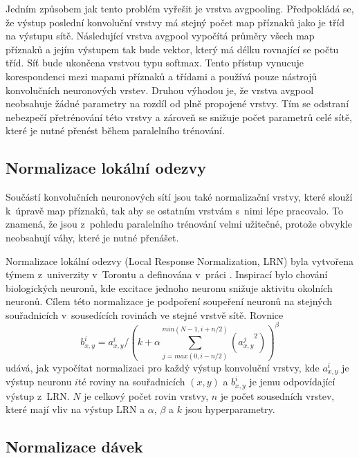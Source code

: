 Jedním způsobem jak tento problém vyřešit je vrstva avgpooling.
Předpokládá se, že výstup poslední konvoluční vrstvy má stejný počet map příznaků jako je tříd na výstupu sítě.
Následující vrstva avgpool vypočítá průměry všech map příznaků a jejím výstupem tak bude vektor, který má délku rovnající se počtu tříd.
Síť bude ukončena vrstvou typu softmax.
Tento přístup vynucuje korespondenci mezi mapami příznaků a třídami a používá pouze nástrojů konvolučních neuronových vrstev.
Druhou výhodou je, že vrstva avgpool neobsahuje žádné parametry na rozdíl od plně propojené vrstvy.
Tím se odstraní nebezpečí přetrénování této vrstvy a zároveň se snižuje počet parametrů celé sítě, které je nutné přenést během paralelního trénování.

\subsection{Normalizace lokální odezvy}
\label{sub:lrn}

Součástí konvolučních neuronových sítí jsou také normalizační vrstvy, které slouží k~úpravě map příznaků, tak aby se ostatním vrstvám s~nimi lépe pracovalo.
To znamená, že jsou z~pohledu paralelního trénování velmi užitečné, protože obvykle neobsahují váhy, které je nutné přenášet.

Normalizace lokální odezvy (Local Response Normalization, LRN) byla vytvořena týmem z~univerzity v~Torontu a definována v~práci \cite{Krizhevsky2012}.
Inspirací bylo chování biologických neuronů, kde excitace jednoho neuronu snižuje aktivitu okolních neuronů.
Cílem této normalizace je podpoření soupeření neuronů na stejných souřadnicích v~sousedících rovinách ve stejné vrstvě sítě.
Rovnice \begin{equation}b^{i}_{x,y}=a^{i}_{x,y}/\left(k+{\alpha}\sum^{min(N-1,i+n/2)}_{j=max(0,i-n/2)}({a^{j}_{x,y}}^{2})\right)^{\beta}\label{eq:lrn}\end{equation} udává, jak vypočítat normalizaci pro každý výstup konvoluční vrstvy, kde $a^{i}_{x,y}$ je výstup neuronu $i$té roviny na souřadnicích $(x,y)$ a $b^{i}_{x,y}$ je jemu odpovídající výstup z~LRN.
$N$ je celkový počet rovin vrstvy, $n$ je počet sousedních vrstev, které mají vliv na výstup LRN a $\alpha$, $\beta$ a $k$ jsou hyperparametry.

\subsection{Normalizace dávek}
\label{sub:bn}

